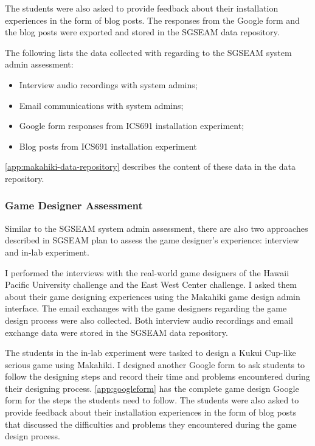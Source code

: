 The students were also asked to provide feedback about their installation experiences in the form of blog posts. The responses from the Google form and the blog posts were exported and stored in the SGSEAM data repository.

The following lists the data collected with regarding to the SGSEAM system admin assessment:

\begin{itemize}
\item Interview audio recordings with system admins;
\item Email communications with system admins;
\item Google form responses from ICS691 installation experiment; 
\item Blog posts from ICS691 installation experiment
\end{itemize}

\autoref{app:makahiki-data-repository} describes the content of these data in the data repository.

\subsubsection{Game Designer Assessment}

Similar to the SGSEAM system admin assessment, there are also two approaches described in SGSEAM plan to assess the game designer's experience: interview and in-lab experiment.

I performed the interviews with the real-world game designers of the Hawaii Pacific University challenge and the East West Center challenge. I asked them about their game designing experiences using the Makahiki game design admin interface. The email exchanges with the game designers regarding the game design process were also collected. Both interview audio recordings and email exchange data were stored in the SGSEAM data repository.
 
The students in the in-lab experiment were tasked to design a Kukui Cup-like serious game using Makahiki. I designed another Google form to ask students to follow the designing steps and record their time and problems encountered during their designing process. \autoref{app:googleform} has the complete game design Google form for the steps the students need to follow. The students were also asked to provide feedback about their installation experiences in the form of blog posts that discussed the difficulties and problems they encountered during the game design process.

